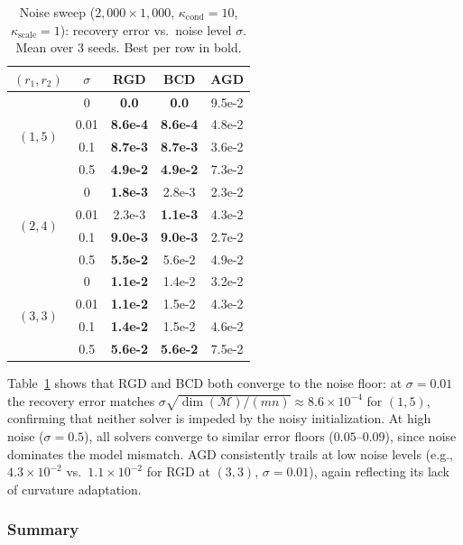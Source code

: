 \documentclass[letterpaper, 10 pt, conference]{ieeeconf}
\newcommand{\cM}{\mathcal{M}}
\theoremstyle{plain}
\theoremstyle{definition}
\theoremstyle{remark}
\begin{document}
\begin{table}[t]
\centering
\caption{Noise sweep ($2{,}000{\times}1{,}000$, $\kappa_{\mathrm{cond}}{=}10$, $\kappa_{\mathrm{scale}}{=}1$): recovery error vs.\ noise level $\sigma$.
Mean over 3 seeds.  Best per row in bold.}
\label{tab:noise}
\small
\begin{tabular}{@{}c c c c c@{}}
\toprule
$(r_1,r_2)$ & $\sigma$ & RGD & BCD & AGD \\
\midrule
\multirow{4}{*}{$(1,5)$}
  & 0    & \textbf{0.0} & \textbf{0.0} & 9.5e-2 \\
  & 0.01 & \textbf{8.6e-4} & \textbf{8.6e-4} & 4.8e-2 \\
  & 0.1  & \textbf{8.7e-3} & \textbf{8.7e-3} & 3.6e-2 \\
  & 0.5  & \textbf{4.9e-2} & \textbf{4.9e-2} & 7.3e-2 \\
\midrule
\multirow{4}{*}{$(2,4)$}
  & 0    & \textbf{1.8e-3} & 2.8e-3 & 2.3e-2 \\
  & 0.01 & 2.3e-3 & \textbf{1.1e-3} & 4.3e-2 \\
  & 0.1  & \textbf{9.0e-3} & \textbf{9.0e-3} & 2.7e-2 \\
  & 0.5  & \textbf{5.5e-2} & 5.6e-2 & 4.9e-2 \\
\midrule
\multirow{4}{*}{$(3,3)$}
  & 0    & \textbf{1.1e-2} & 1.4e-2 & 3.2e-2 \\
  & 0.01 & \textbf{1.1e-2} & 1.5e-2 & 4.3e-2 \\
  & 0.1  & \textbf{1.4e-2} & 1.5e-2 & 4.6e-2 \\
  & 0.5  & \textbf{5.6e-2} & \textbf{5.6e-2} & 7.5e-2 \\
\bottomrule
\end{tabular}
\end{table}

Table~\ref{tab:noise} shows that RGD and BCD both converge to the noise floor: at $\sigma{=}0.01$ the recovery error matches $\sigma\sqrt{\dim(\cM)/(mn)} \approx 8.6{\times}10^{-4}$ for $(1,5)$, confirming that neither solver is impeded by the noisy initialization.
At high noise ($\sigma{=}0.5$), all solvers converge to similar error floors ($0.05$--$0.09$), since noise dominates the model mismatch.
AGD consistently trails at low noise levels (e.g., $4.3{\times}10^{-2}$ vs.\ $1.1{\times}10^{-2}$ for RGD at $(3,3)$, $\sigma{=}0.01$), again reflecting its lack of curvature adaptation.

\subsubsection{Summary}
\end{document}
